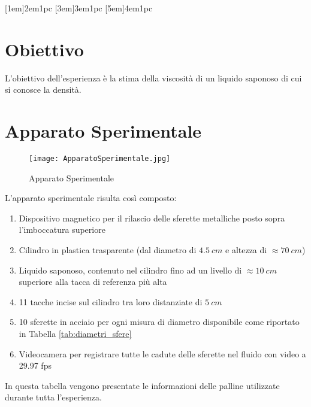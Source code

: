 \documentclass[a4paper,11pt,oneside]{article}
\begin{document}


\clearpage

\tableofcontents
{}
\contentsmargin{6em}
[1em]{\bigskip}{2em}{1pc}
[3em]{\smallskip}{3em}{1pc}
[5em]{\smallskip}{4em}{1pc}
\newpage

\section{Obiettivo}
L'obiettivo dell'esperienza è la stima della viscosità di un liquido saponoso di cui si conosce la densità.

\section{Apparato Sperimentale}


\begin{wrapfigure}{l}{4cm}
    \texttt{[image: ApparatoSperimentale.jpg]}
    \label{fig:apparato_sperimentale}
    \caption{Apparato Sperimentale}
\end{wrapfigure}

L'apparato sperimentale risulta così composto:
\begin{enumerate}[label={\alph*.}]
    \item Dispositivo magnetico per il rilascio delle sferette metalliche posto sopra l'imboccatura superiore
    \item Cilindro in plastica trasparente (dal diametro di $\SI{4.5}{cm}$ e altezza di $\approx\SI{70}{cm}$)
    \item Liquido saponoso, contenuto nel cilindro fino ad un livello di $\approx\SI{10}{cm}$ superiore alla tacca di referenza più alta
    \item 11 tacche incise sul cilindro tra loro distanziate di $\SI{5}{cm}$
    \item 10 sferette in acciaio per ogni misura di diametro disponibile come riportato in Tabella \ref{tab:diametri_sfere}
    \item Videocamera per registrare tutte le cadute delle sferette nel fluido con video a 29.97 fps 
\end{enumerate}
In questa tabella vengono presentate le informazioni delle palline utilizzate durante tutta l'esperienza.
\end{document}

